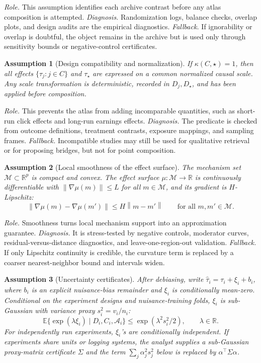 \documentclass[11pt]{article}
\numberwithin{equation}{section}
\newtheorem{assumption}{Assumption}[section]
\newcommand{\E}{\mathbb E}
\newcommand{\R}{\mathbb R}
\newcommand{\1}{\mathbf 1}
\newcommand{\cA}{\mathcal A}
\newcommand{\cM}{\mathcal M}
\newcommand{\norm}[1]{\left\lVert #1\right\rVert}
\begin{document}
\emph{Role.}  This assumption identifies each archive contrast before any atlas composition is attempted.  \emph{Diagnosis.}  Randomization logs, balance checks, overlap plots, and design audits are the empirical diagnostics.  \emph{Fallback.}  If ignorability or overlap is doubtful, the object remains in the archive but is used only through sensitivity bounds or negative-control certificates.

\begin{assumption}[Design compatibility and normalization]
\label{ass:compatibility}
If \(\kappa(C,\star)=1\), then all effects \(\{\tau_j:j\in C\}\) and \(\tau_\star\) are expressed on a common normalized causal scale.  Any scale transformation is deterministic, recorded in \(D_j,D_\star\), and has been applied before composition.
\end{assumption}

\emph{Role.}  This prevents the atlas from adding incomparable quantities, such as short-run click effects and long-run earnings effects.  \emph{Diagnosis.}  The predicate is checked from outcome definitions, treatment contrasts, exposure mappings, and sampling frames.  \emph{Fallback.}  Incompatible studies may still be used for qualitative retrieval or for proposing bridges, but not for point composition.

\begin{assumption}[Local smoothness of the effect surface]
\label{ass:smooth}
The mechanism set \(\cM\subset\R^p\) is compact and convex.  The effect surface \(\mu:\cM\to\R\) is continuously differentiable with \(\norm{\nabla\mu(m)}\le L\) for all \(m\in\cM\), and its gradient is \(H\)-Lipschitz:
\[
  \norm{\nabla\mu(m)-\nabla\mu(m')}\le H\norm{m-m'}
  \qquad\text{for all }m,m'\in\cM.
\]
\end{assumption}

\emph{Role.}  Smoothness turns local mechanism support into an approximation guarantee.  \emph{Diagnosis.}  It is stress-tested by negative controls, moderator curves, residual-versus-distance diagnostics, and leave-one-region-out validation.  \emph{Fallback.}  If only Lipschitz continuity is credible, the curvature term is replaced by a coarser nearest-neighbor bound and intervals widen.

\begin{assumption}[Uncertainty certificates]
\label{ass:noise}
After debiasing, write \(\widehat\tau_i=\tau_i+\xi_i+b_i\), where \(b_i\) is an explicit nuisance-bias remainder and \(\xi_i\) is conditionally mean-zero.  Conditional on the experiment designs and nuisance-training folds, \(\xi_i\) is sub-Gaussian with variance proxy \(s_i^2=v_i/n_i\):
\[
  \E\{\exp(\lambda\xi_i)\mid D_i,C_i,\cA_i\}\le \exp(\lambda^2s_i^2/2),
  \qquad \lambda\in\R.
\]
For independently run experiments, \(\xi_i\)'s are conditionally independent.  If experiments share units or logging systems, the analyst supplies a sub-Gaussian proxy-matrix certificate \(\Sigma\) and the term \(\sum_j\alpha_j^2s_j^2\) below is replaced by \(\alpha^\top\Sigma\alpha\).
\end{assumption}
\end{document}
